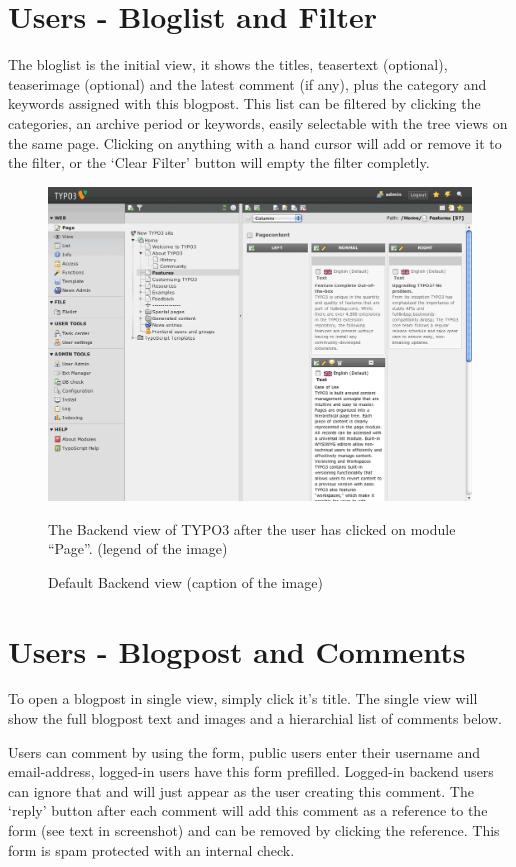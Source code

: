 \documentclass[a4paper,10pt,english]{sphinxmanual}
\begin{document}
\section{Users - Bloglist and Filter}
\label{UsersManual/Index:users-bloglist-and-filter}
The bloglist is the initial view, it shows the titles, teasertext (optional), teaserimage (optional) and the latest comment (if any), plus the category and keywords assigned with this blogpost.
This list can be filtered by clicking the categories, an archive period or keywords, easily selectable with the tree views on the same page. Clicking on anything with a hand cursor will add or remove it to the filter, or the `Clear Filter' button will empty the filter completly.
\begin{figure}[htbp]
\centering
\capstart

\includegraphics{BackendView.png}
\caption{Default Backend view (caption of the image)}{\small 
The Backend view of TYPO3 after the user has clicked on module ``Page''. (legend of the image)
}\end{figure}


\section{Users - Blogpost and Comments}
\label{UsersManual/Index:users-blogpost-and-comments}
To open a blogpost in single view, simply click it's title. The single view will show the full blogpost text and images and a hierarchial list of comments below.

Users can comment by using the form, public users enter their username and email-address, logged-in users have this form prefilled. Logged-in backend users can ignore that and will just appear as the user creating this comment. The `reply' button after each comment will add this comment as a reference to the form (see text in screenshot) and can be removed by clicking the reference. This form is spam protected with an internal check.
\end{document}
